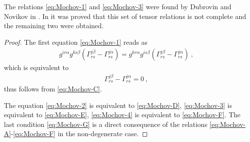 \begin{remark}
    The relations \eqref{eq:Mochov-1} and \eqref{eq:Mochov-3} were found by Dubrovin and Novikov in \cite{Dubrovin-Novikov}. In \cite{Mochov} it was proved that this set of tensor relations is not complete and the remaining two were obtained.
\end{remark}

\begin{proof}
    The first equation \eqref{eq:Mochov-1} reads as
    \begin{align}
        g^{ir \alpha} g^{ks \beta} (\Gamma^{j\beta}_{rs} - \Gamma^{j \alpha}_{rs}) = g^{kr \alpha} g^{is \beta} (\Gamma^{j\beta}_{rs} - \Gamma^{j \alpha}_{rs}) \:,
    \end{align}
    which is equivalent to
    \begin{align}
        \Gamma^{j \beta}_{rs} - \Gamma^{j \alpha}_{rs} = 0 \:,
    \end{align}
    thus follows from \eqref{eq:Mochov-C}.

    The equation \eqref{eq:Mochov-2} is equivalent to \eqref{eq:Mochov-D}, \eqref{eq:Mochov-3} is equivalent to \eqref{eq:Mochov-E}, \eqref{eq:Mochov-4} is equivalent to \eqref{eq:Mochov-F}. The last condition \eqref{eq:Mochov-G} is a direct consequence of the relations \eqref{eq:Mochov-A}-\eqref{eq:Mochov-F} in the non-degenerate case.
\end{proof}

